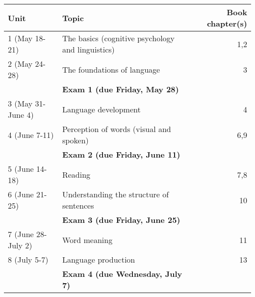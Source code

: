 \documentclass[10pt]{article}
\begin{document}
\begin{center}
\begin{tabular}{llr}
Unit & Topic & Book chapter(s)\\
\hline
1 (May 18-21) & The basics (cognitive psychology and linguistics) & 1,2\\
2 (May 24-28) & The foundations of language & 3\\
 & \textbf{Exam 1 (due Friday, May 28)} & \\
3 (May 31-June 4) & Language development & 4\\
4 (June 7-11) & Perception of words (visual and spoken) & 6,9\\
 & \textbf{Exam 2 (due Friday, June 11)} & \\
5 (June 14-18) & Reading & 7,8\\
6 (June 21-25) & Understanding the structure of sentences & 10\\
 & \textbf{Exam 3 (due Friday, June 25)} & \\
7 (June 28-July 2) & Word meaning & 11\\
8 (July 5-7) & Language production & 13\\
 & \textbf{Exam 4 (due Wednesday, July 7)} & \\
\end{tabular}
\end{center}
\end{document}
